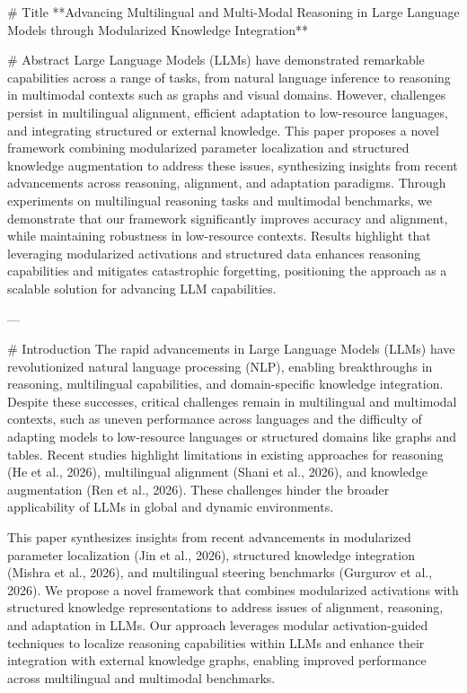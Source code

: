 # Title  
**Advancing Multilingual and Multi-Modal Reasoning in Large Language Models through Modularized Knowledge Integration**

# Abstract  
Large Language Models (LLMs) have demonstrated remarkable capabilities across a range of tasks, from natural language inference to reasoning in multimodal contexts such as graphs and visual domains. However, challenges persist in multilingual alignment, efficient adaptation to low-resource languages, and integrating structured or external knowledge. This paper proposes a novel framework combining modularized parameter localization and structured knowledge augmentation to address these issues, synthesizing insights from recent advancements across reasoning, alignment, and adaptation paradigms. Through experiments on multilingual reasoning tasks and multimodal benchmarks, we demonstrate that our framework significantly improves accuracy and alignment, while maintaining robustness in low-resource contexts. Results highlight that leveraging modularized activations and structured data enhances reasoning capabilities and mitigates catastrophic forgetting, positioning the approach as a scalable solution for advancing LLM capabilities.

---

# Introduction  
The rapid advancements in Large Language Models (LLMs) have revolutionized natural language processing (NLP), enabling breakthroughs in reasoning, multilingual capabilities, and domain-specific knowledge integration. Despite these successes, critical challenges remain in multilingual and multimodal contexts, such as uneven performance across languages and the difficulty of adapting models to low-resource languages or structured domains like graphs and tables. Recent studies highlight limitations in existing approaches for reasoning (He et al., 2026), multilingual alignment (Shani et al., 2026), and knowledge augmentation (Ren et al., 2026). These challenges hinder the broader applicability of LLMs in global and dynamic environments.

This paper synthesizes insights from recent advancements in modularized parameter localization (Jin et al., 2026), structured knowledge integration (Mishra et al., 2026), and multilingual steering benchmarks (Gurgurov et al., 2026). We propose a novel framework that combines modularized activations with structured knowledge representations to address issues of alignment, reasoning, and adaptation in LLMs. Our approach leverages modular activation-guided techniques to localize reasoning capabilities within LLMs and enhance their integration with external knowledge graphs, enabling improved performance across multilingual and multimodal benchmarks.


